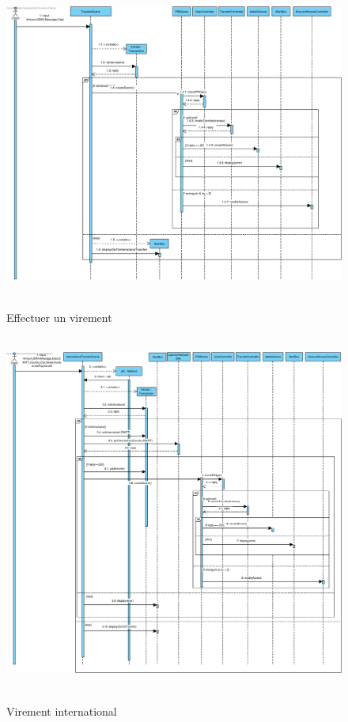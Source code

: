 \documentclass[]{report}
\begin{document}
\begin{figure}[h!]
	\hbox{
		\centering\includegraphics[scale=0.69]{img/Sequence 1 - Extension 2.pdf}
	}
	\caption{Effectuer un virement}
	\end{figure}

\newpage

\begin{figure}[h!]
	\hbox{
		\centering\includegraphics[scale=0.8]{img/Sequence 2 - Extension 2.pdf}
	}
	\caption{Virement international}
	\end{figure}

\newpage
\end{document}
